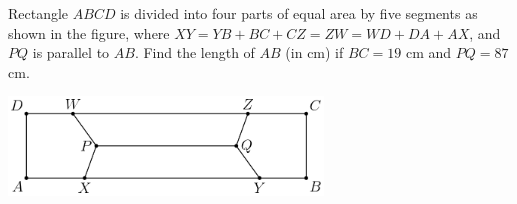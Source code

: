 Rectangle $ABCD$ is divided into four parts of equal area by five segments as shown in the figure, where $XY = YB + BC + CZ = ZW = WD + DA + AX$, and $PQ$ is parallel to $AB$.  Find the length of $AB$ (in cm) if $BC = 19$ cm and $PQ = 87$ cm.

\begin{center}
\includegraphics[width = 83.60000000000001mm]{img/fig0.png}
\end{center}